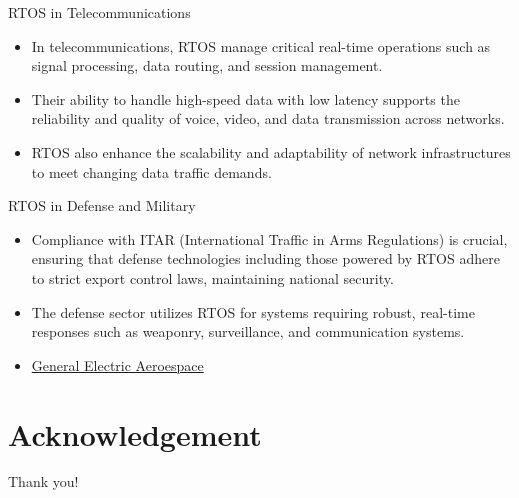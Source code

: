 \documentclass[10pt]{beamer}
\begin{document}
\begin{frame}{RTOS in Telecommunications}
    \begin{itemize}
        \item In telecommunications, RTOS manage critical real-time operations such as signal processing, data routing, and session management.
        \item Their ability to handle high-speed data with low latency supports the reliability and quality of voice, video, and data transmission across networks.
        \item RTOS also enhance the scalability and adaptability of network infrastructures to meet changing data traffic demands.
    \end{itemize}
\end{frame}

\begin{frame}{RTOS in Defense and Military}
    \begin{itemize}
        \item Compliance with ITAR (International Traffic in Arms Regulations) is crucial, ensuring that defense technologies including those powered by RTOS adhere to strict export control laws, maintaining national security.
        \item The defense sector utilizes RTOS for systems requiring robust, real-time responses such as weaponry, surveillance, and communication systems.
        \item \href{https://www.geaerospace.com/military-defense/engines/xa100}{General Electric Aeroespace}
    \end{itemize}
\end{frame}

\section*{Acknowledgement}  
\begin{frame}
\textcolor{myNewColorA}{\Huge{\centerline{Thank you!}}}
\end{frame}
\end{document}
